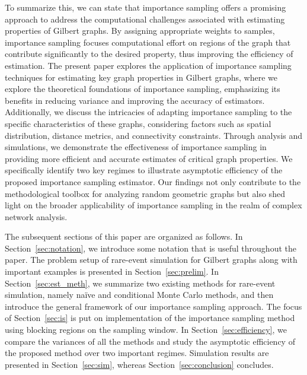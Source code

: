\documentclass[pdflatex, sn-mathphys-ay]{sn-jnl}%
\theoremstyle{thmstyleone}%
\theoremstyle{thmstyletwo}%
\theoremstyle{thmstylethree}%
\begin{document}
To summarize this, we can state that
importance sampling offers a promising approach to address the computational challenges associated with estimating properties of Gilbert graphs. By assigning appropriate weights to samples, importance sampling focuses computational effort on regions of the graph that contribute significantly to the desired property, thus improving the efficiency of estimation.
The present paper explores the application of importance sampling techniques for estimating key graph properties in Gilbert graphs, where we explore the theoretical foundations of importance sampling, emphasizing its benefits in reducing variance and improving the accuracy of estimators. Additionally, we discuss the intricacies of adapting importance sampling to the specific characteristics of these graphs, considering factors such as spatial distribution, distance metrics, and connectivity constraints.
Through analysis and simulations, we demonstrate the effectiveness of importance sampling in providing more efficient and accurate estimates of critical graph properties. We specifically identify two key regimes to illustrate asymptotic efficiency of the proposed importance sampling estimator. Our findings not only contribute to the methodological toolbox for analyzing random geometric graphs but also shed light on the broader applicability of importance sampling in the realm of complex network analysis.

The subsequent sections of this paper are organized as follows. In Section~\ref{sec:notation}, we introduce some notation that is useful throughout the paper. The problem setup of rare-event simulation for Gilbert graphs along with important examples is presented in Section~\ref{sec:prelim}. In Section~\ref{sec:est_meth}, we summarize two existing methods for rare-event simulation, namely na\"{i}ve and conditional Monte Carlo methods, and then introduce the general framework of our importance sampling approach. The focus of Section~\ref{sec:is} is put on implementation of the importance sampling method using blocking regions on the sampling window. In Section~\ref{sec:efficiency}, we compare the variances of all the methods and study {  the asymptotic efficiency} of the proposed method over two important regimes. Simulation results are presented in Section~\ref{sec:sim}, whereas Section~\ref{sec:conclusion} concludes. 


\end{document}
